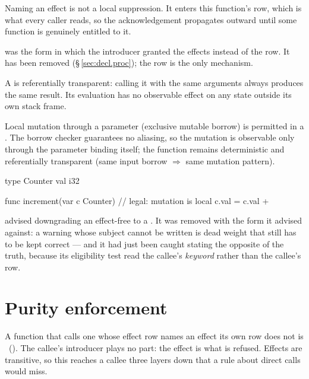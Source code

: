 \pnum
Naming an effect is not a local suppression.  It enters this function's row, which
is what every caller reads, so the acknowledgement propagates outward until some
function is genuinely entitled to it.

\begin{note}
   was the form in which the introducer granted the effects instead of
  the row.  It has been removed (\S\,\ref{sec:decl.proc}); the row is the only
  mechanism.
\end{note}

\pnum
A  is referentially transparent: calling it with the same
arguments always produces the same result.  Its evaluation has no
observable effect on any state outside its own stack frame.

\pnum
Local mutation through a  parameter (exclusive mutable
borrow) is permitted in a . The borrow checker guarantees
no aliasing, so the mutation is observable only through the
parameter binding itself; the function remains deterministic and
referentially transparent (same input borrow $\Rightarrow$ same
mutation pattern).

\begin{example}
\begin{laincode}
type Counter { val i32 }

func increment(var c Counter) {  // legal: mutation is local
    c.val = c.val +%
}
\end{laincode}
\end{example}

\pnum
{} advised downgrading an effect-free  to a .
It was removed with the form it advised against: a warning whose subject cannot be
written is dead weight that still has to be kept correct --- and it had just been
caught stating the opposite of the truth, because its eligibility test read the
callee's \emph{keyword} rather than the callee's row.

\section{Purity enforcement}
\label{sec:fn.purity}

\begin{constraint}
  A function that calls one whose effect row names an effect its own row does not
  is \illformed{}~().  The callee's introducer plays no part: the
  effect is what is refused.  Effects are transitive, so this reaches a callee
  three layers down that a rule about direct calls would miss.
\end{constraint}


